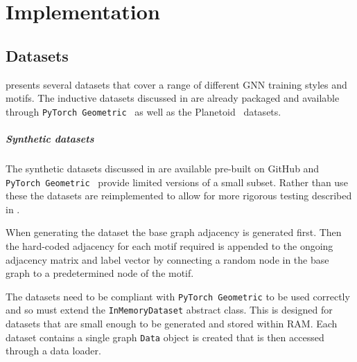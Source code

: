 \chapter{Implementation}

\section{Datasets}
\label{sec:datasets-imp}
 presents several datasets that cover a range of different GNN training styles and motifs.
The inductive datasets discussed in  are already packaged and available through \texttt{PyTorch Geometric}~\cite{Fey/Lenssen/2019} as well as the Planetoid~\cite{planetoid,citation} datasets.

\paragraph{Synthetic datasets}
The synthetic datasets discussed in  are available pre-built on GitHub and \texttt{PyTorch Geometric}~\cite{Fey/Lenssen/2019} provide limited versions of a small subset.
Rather than use these the datasets are reimplemented to allow for more rigorous testing described in .

When generating the dataset the base graph adjacency is generated first. 
Then the hard-coded adjacency for each motif required is 
appended to the ongoing adjacency matrix and label vector by connecting
a random node in the base graph to a predetermined node of the motif.

The datasets need to be compliant with \texttt{PyTorch Geometric} to be used correctly and so must extend the \texttt{InMemoryDataset} abstract class. 
This is designed for datasets that are small enough to be generated and stored within RAM.
Each dataset contains a single graph \texttt{Data} object is created that is then accessed through a data loader.

